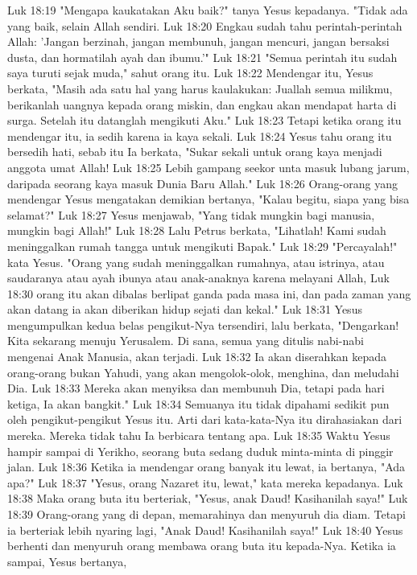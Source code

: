 Luk 18:19  "Mengapa kaukatakan Aku baik?" tanya Yesus kepadanya. "Tidak ada yang baik, selain Allah sendiri.
Luk 18:20  Engkau sudah tahu perintah-perintah Allah: 'Jangan berzinah, jangan membunuh, jangan mencuri, jangan bersaksi dusta, dan hormatilah ayah dan ibumu.'"
Luk 18:21  "Semua perintah itu sudah saya turuti sejak muda," sahut orang itu.
Luk 18:22  Mendengar itu, Yesus berkata, "Masih ada satu hal yang harus kaulakukan: Juallah semua milikmu, berikanlah uangnya kepada orang miskin, dan engkau akan mendapat harta di surga. Setelah itu datanglah mengikuti Aku."
Luk 18:23  Tetapi ketika orang itu mendengar itu, ia sedih karena ia kaya sekali.
Luk 18:24  Yesus tahu orang itu bersedih hati, sebab itu Ia berkata, "Sukar sekali untuk orang kaya menjadi anggota umat Allah!
Luk 18:25  Lebih gampang seekor unta masuk lubang jarum, daripada seorang kaya masuk Dunia Baru Allah."
Luk 18:26  Orang-orang yang mendengar Yesus mengatakan demikian bertanya, "Kalau begitu, siapa yang bisa selamat?"
Luk 18:27  Yesus menjawab, "Yang tidak mungkin bagi manusia, mungkin bagi Allah!"
Luk 18:28  Lalu Petrus berkata, "Lihatlah! Kami sudah meninggalkan rumah tangga untuk mengikuti Bapak."
Luk 18:29  "Percayalah!" kata Yesus. "Orang yang sudah meninggalkan rumahnya, atau istrinya, atau saudaranya atau ayah ibunya atau anak-anaknya karena melayani Allah,
Luk 18:30  orang itu akan dibalas berlipat ganda pada masa ini, dan pada zaman yang akan datang ia akan diberikan hidup sejati dan kekal."
Luk 18:31  Yesus mengumpulkan kedua belas pengikut-Nya tersendiri, lalu berkata, "Dengarkan! Kita sekarang menuju Yerusalem. Di sana, semua yang ditulis nabi-nabi mengenai Anak Manusia, akan terjadi.
Luk 18:32  Ia akan diserahkan kepada orang-orang bukan Yahudi, yang akan mengolok-olok, menghina, dan meludahi Dia.
Luk 18:33  Mereka akan menyiksa dan membunuh Dia, tetapi pada hari ketiga, Ia akan bangkit."
Luk 18:34  Semuanya itu tidak dipahami sedikit pun oleh pengikut-pengikut Yesus itu. Arti dari kata-kata-Nya itu dirahasiakan dari mereka. Mereka tidak tahu Ia berbicara tentang apa.
Luk 18:35  Waktu Yesus hampir sampai di Yerikho, seorang buta sedang duduk minta-minta di pinggir jalan.
Luk 18:36  Ketika ia mendengar orang banyak itu lewat, ia bertanya, "Ada apa?"
Luk 18:37  "Yesus, orang Nazaret itu, lewat," kata mereka kepadanya.
Luk 18:38  Maka orang buta itu berteriak, "Yesus, anak Daud! Kasihanilah saya!"
Luk 18:39  Orang-orang yang di depan, memarahinya dan menyuruh dia diam. Tetapi ia berteriak lebih nyaring lagi, "Anak Daud! Kasihanilah saya!"
Luk 18:40  Yesus berhenti dan menyuruh orang membawa orang buta itu kepada-Nya. Ketika ia sampai, Yesus bertanya,
